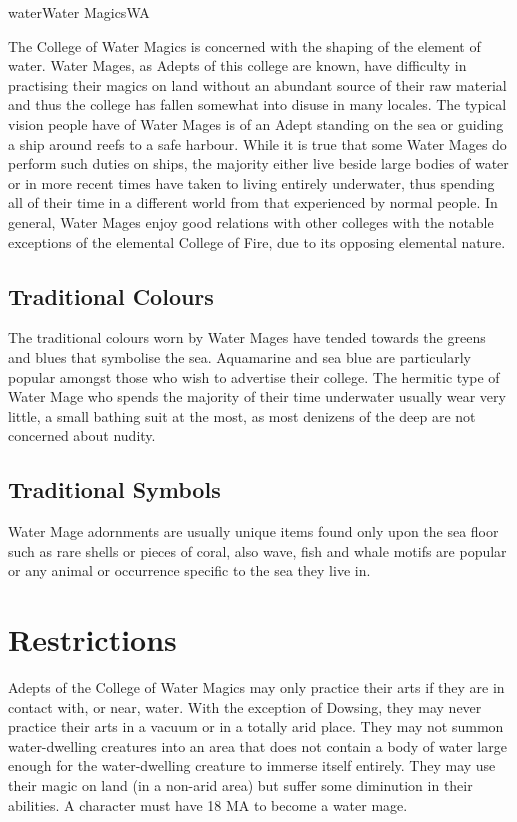 \begin{College}[1.3]{water}{Water Magics}{WA}

The College of Water Magics is concerned with the shaping of the
element of water.  Water Mages, as Adepts of this college are known,
have difficulty in practising their magics on land without an abundant
source of their raw material and thus the college has fallen somewhat
into disuse in many locales.  The typical vision people have of Water
Mages is of an Adept standing on the sea or guiding a ship around
reefs to a safe harbour. While it is true that some Water Mages do
perform such duties on ships, the majority either live beside large
bodies of water or in more recent times have taken to living entirely
underwater, thus spending all of their time in a different world from
that experienced by normal people.  In general, Water Mages enjoy good
relations with other colleges with the notable exceptions of the
elemental College of Fire, due to its opposing elemental nature.

\subsection{Traditional Colours}

The traditional colours worn by Water Mages have tended towards the
greens and blues that symbolise the sea.  Aquamarine and sea blue are
particularly popular amongst those who wish to advertise their
college.  The hermitic type of Water Mage who spends the majority of
their time underwater usually wear very little, a small bathing suit
at the most, as most denizens of the deep are not concerned about
nudity.

\subsection{Traditional Symbols}

Water Mage adornments are usually unique items found only upon the sea
floor such as rare shells or pieces of coral, also wave, fish and
whale motifs are popular or any animal or occurrence specific to the
sea they live in.

\section{Restrictions}

Adepts of the College of Water Magics may only practice their arts if
they are in contact with, or near, water.  With the exception of
Dowsing, they may never practice their arts in a vacuum or in a
totally arid place.  They may not summon water-dwelling creatures into
an area that does not contain a body of water large enough for the
water-dwelling creature to immerse itself entirely.  They may use
their magic on land (in a non-arid area) but suffer some diminution in
their abilities.  A character must have 18 MA to become a water mage.


\end{College}
